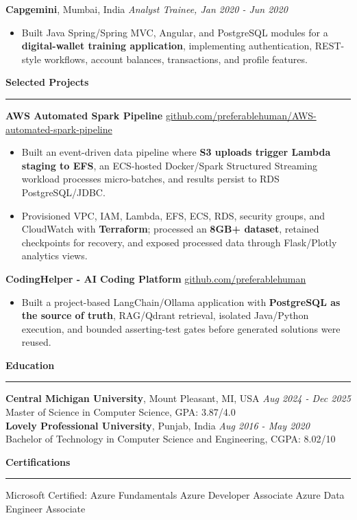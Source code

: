 \documentclass[11pt,letterpaper]{article}
\newcommand{\ressection}[1]{\Needspace{6\baselineskip}\vspace{8pt}\par\textbf{#1}\par\vspace{2pt}\hrule\vspace{5pt}}
\begin{document}
\textbf{Capgemini}, Mumbai, India \hfill \textit{Analyst Trainee, Jan 2020 - Jun 2020}
\begin{itemize}
  \item Built Java Spring/Spring MVC, Angular, and PostgreSQL modules for a \textbf{digital-wallet training application}, implementing authentication, REST-style workflows, account balances, transactions, and profile features.
\end{itemize}

\ressection{Selected Projects}
\textbf{AWS Automated Spark Pipeline} \hfill \href{https://github.com/preferablehuman/AWS-automated-spark-pipeline}{github.com/preferablehuman/AWS-automated-spark-pipeline}
\begin{itemize}
  \item Built an event-driven data pipeline where \textbf{S3 uploads trigger Lambda staging to EFS}, an ECS-hosted Docker/Spark Structured Streaming workload processes micro-batches, and results persist to RDS PostgreSQL/JDBC.
  \item Provisioned VPC, IAM, Lambda, EFS, ECS, RDS, security groups, and CloudWatch with \textbf{Terraform}; processed an \textbf{8GB+ dataset}, retained checkpoints for recovery, and exposed processed data through Flask/Plotly analytics views.
\end{itemize}
\vspace{2pt}
\textbf{CodingHelper - AI Coding Platform} \hfill \href{https://github.com/preferablehuman}{github.com/preferablehuman}
\begin{itemize}
  \item Built a project-based LangChain/Ollama application with \textbf{PostgreSQL as the source of truth}, RAG/Qdrant retrieval, isolated Java/Python execution, and bounded asserting-test gates before generated solutions were reused.
\end{itemize}

\ressection{Education}
\textbf{Central Michigan University}, Mount Pleasant, MI, USA \hfill \textit{Aug 2024 - Dec 2025}\\
Master of Science in Computer Science, GPA: 3.87/4.0\\[2pt]
\textbf{Lovely Professional University}, Punjab, India \hfill \textit{Aug 2016 - May 2020}\\
Bachelor of Technology in Computer Science and Engineering, CGPA: 8.02/10

\ressection{Certifications}
Microsoft Certified: Azure Fundamentals \textbar{} Azure Developer Associate \textbar{} Azure Data Engineer Associate
\end{document}
